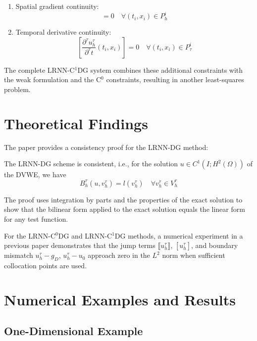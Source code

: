 \documentclass[11pt,a4paper]{article}
\begin{document}
\begin{enumerate}
    \item Spatial gradient continuity:
    \begin{equation}
    [\nabla_h u_h^\tau] = 0 \quad \forall (t_i, x_i) \in P_h^i
    \end{equation}
    
    \item Temporal derivative continuity:
    \begin{equation}
    \left[\frac{\partial^\tau u_h^\tau}{\partial^\tau t}(t_i, x_i)\right] = 0 \quad \forall (t_i, x_i) \in P_\tau^i
    \end{equation}
\end{enumerate}

The complete LRNN-C$^1$DG system combines these additional constraints with the weak formulation and the C$^0$ constraints, resulting in another least-squares problem.

\section{Theoretical Findings}

The paper provides a consistency proof for the LRNN-DG method:

\begin{theorem}[Consistency]
The LRNN-DG scheme is consistent, i.e., for the solution $u \in C^1(I; H^2(\Omega))$ of the DVWE, we have
\begin{equation}
B_h^\tau(u, v_h^\tau) = l(v_h^\tau) \quad \forall v_h^\tau \in V_h^\tau
\end{equation}
\end{theorem}

The proof uses integration by parts and the properties of the exact solution to show that the bilinear form applied to the exact solution equals the linear form for any test function.

For the LRNN-C$^0$DG and LRNN-C$^1$DG methods, a numerical experiment in a previous paper demonstrates that the jump terms $\llbracket u_h^\tau \rrbracket$, $[u_h^\tau]$, and boundary mismatch $u_h^\tau - g_D$, $u_h^\tau - u_0$ approach zero in the $L^2$ norm when sufficient collocation points are used.

\section{Numerical Examples and Results}

\subsection{One-Dimensional Example}
\end{document}
